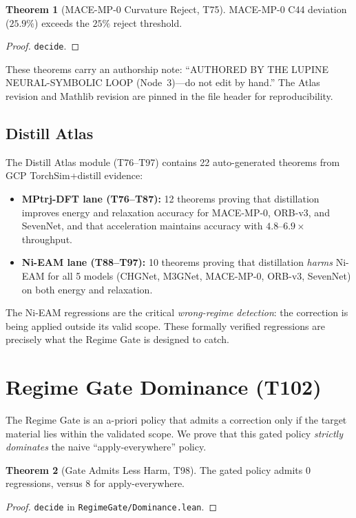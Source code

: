 \documentclass[11pt,a4paper]{article}
\theoremstyle{definition}
\newtheorem{theorem}{Theorem}[section]
\theoremstyle{plain}
\begin{document}
\begin{theorem}[MACE-MP-0 Curvature Reject, T75]
\label{thm:macereject}
MACE-MP-0 C44 deviation ($25.9\%$) exceeds the $25\%$ reject threshold.
\end{theorem}
\begin{proof}
\texttt{decide}.
\end{proof}

These theorems carry an authorship note: ``AUTHORED BY THE LUPINE NEURAL-SYMBOLIC LOOP (Node~3)---do not edit by hand.'' The Atlas revision and Mathlib revision are pinned in the file header for reproducibility.

\subsection{Distill Atlas}
\label{subsec:atlas}

The Distill Atlas module (T76--T97) contains 22 auto-generated theorems from GCP TorchSim+distill evidence:
\begin{itemize}
\item \textbf{MPtrj-DFT lane (T76--T87):} 12 theorems proving that distillation improves energy and relaxation accuracy for MACE-MP-0, ORB-v3, and SevenNet, and that acceleration maintains accuracy with $4.8$--$6.9\times$ throughput.
\item \textbf{Ni-EAM lane (T88--T97):} 10 theorems proving that distillation \emph{harms} Ni-EAM for all 5 models (CHGNet, M3GNet, MACE-MP-0, ORB-v3, SevenNet) on both energy and relaxation.
\end{itemize}
The Ni-EAM regressions are the critical \emph{wrong-regime detection}: the correction is being applied outside its valid scope. These formally verified regressions are precisely what the Regime Gate is designed to catch.

\section{Regime Gate Dominance (T102)}
\label{sec:regime}

The Regime Gate is an a-priori policy that admits a correction only if the target material lies within the validated scope. We prove that this gated policy \emph{strictly dominates} the naive ``apply-everywhere'' policy.

\begin{theorem}[Gate Admits Less Harm, T98]
\label{thm:lessharm}
The gated policy admits 0 regressions, versus 8 for apply-everywhere.
\end{theorem}
\begin{proof}
\texttt{decide} in \texttt{RegimeGate/Dominance.lean}.
\end{proof}
\end{document}
